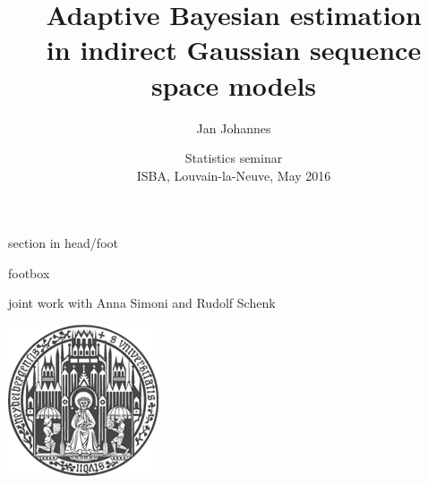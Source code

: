 \documentclass[english,fleqn]{beamer}%
\title[Adaptive  Bayesian estimation in iGSSM] %
{\sc Adaptive  Bayesian estimation\\ in indirect Gaussian sequence space models}
\author[Jan {\sc Johannes}] %
{{Jan {\sc Johannes}}}
\institute[RKU Heidelberg] %
{\ds Ruprecht-Karls-Universität Heidelberg\\[1ex]}
\date[Vortrag] %
{\dy\normalsize  Statistics seminar\\[.5ex]   ISBA, Louvain-la-Neuve,
  May 2016\\[5ex]}
\renewcommand{\1}{\mathbbm{1}}
\newcommand{\dgrau}{\color{gray}}
\theoremstyle{mydefi}
\theoremstyle{mynote}
\begin{document}
\hypertarget{FiPa}{}
{%
\begin{beamercolorbox}[ht=2.5ex,dp=1.5ex]{section in head/foot} 
\end{beamercolorbox}%
} 
{%
\begin{beamercolorbox}[ht=2.5ex,dp=1.5ex]{footbox} 
\end{beamercolorbox}%
}
\begin{frame}
\begin{overlayarea}{\textwidth}{.1\textheight}%
\end{overlayarea}
\begin{overlayarea}{\textwidth}{.74\textheight}%
  \titlepage
\end{overlayarea}
\begin{overlayarea}{\textwidth}{.1\textheight}%
{\begin{minipage}[t]{.11\textwidth}\hfill\null
\end{minipage}}
\hfill{\dgrau\small joint work with Anna Simoni and Rudolf  Schenk}\hfill
{\begin{minipage}[t]{.11\textwidth}
\includegraphics[scale=.23]{./Images/siegel_uni_hd_gross.png}
\end{minipage}}
\end{overlayarea}
\end{frame}

\end{document}

